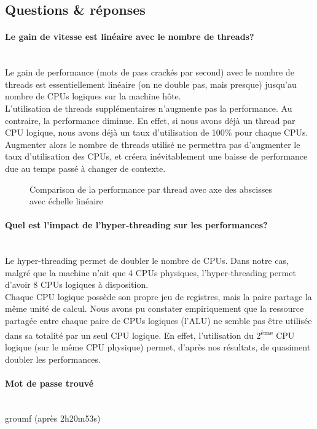 \documentclass[11pt, a4paper]{article}
\newcommand{\paragraphnl}[1]{\paragraph{#1}\mbox{}\\}
\begin{document}
\newpage
\subsection{Questions \& réponses}
\paragraphnl{Le gain de vitesse est linéaire avec le nombre de threads?}
Le gain de performance (mots de pass crackés par second) avec le nombre de threads est essentiellement linéaire (on ne double pas, mais presque) jusqu'au nombre de CPUs logiques sur la machine hôte. \\

L'utilisation de threads supplémentaires n'augmente pas la performance. Au contraire, la performance diminue. 
En effet, si nous avons déjà un thread par CPU logique, nous avons déjà un taux d'utilisation de 100\% pour chaque CPUs. Augmenter alors le nombre de threads utilisé ne permettra pas d'augmenter le taux d'utilisation des CPUs, et créera inévitablement une baisse de performance due au temps passé à changer de contexte.\\


\begin{figure}[H]
	\begin{center}
	\end{center}
    \caption{Comparison de la performance par thread avec axe des abscisses avec échelle linéaire}
    \label{Comparison de la performance par thread avec axe des abscisses avec échelle linéaire}
\end{figure}

\paragraphnl{Quel est l'impact de l'hyper-threading sur les performances?}
Le hyper-threading permet de doubler le nombre de CPUs. Dans notre cas, malgré que la machine n'ait que 4 CPUs physiques, l'hyper-threading permet d'avoir 8 CPUs logiques à disposition. \\

Chaque CPU logique possède son propre jeu de registres, mais la paire partage la même unité de calcul. Nous avons pu constater empiriquement que la ressource partagée entre chaque paire de CPUs logiques (l'ALU) ne semble pas être utilisée dans sa totalité par un seul CPU logique. En effet, l'utilisation du 2\textsuperscript{ème} CPU logique (sur le même CPU physique) permet, d'après nos résultats, de quasiment doubler les performances.
 
\paragraphnl{Mot de passe trouvé}
groumf (après 2h20m53s)
\end{document}
